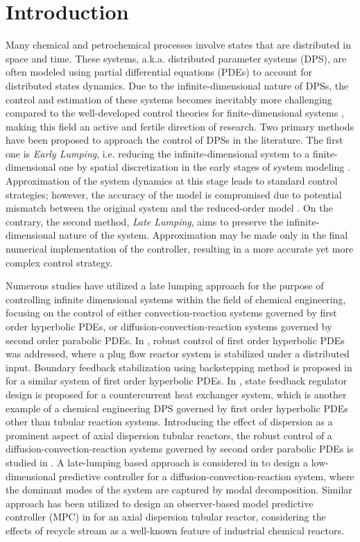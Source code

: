 \section{Introduction}

Many chemical and petrochemical processes involve states that are distributed in space and time. These systems, a.k.a. distributed parameter systems (DPS), are often modeled using partial differential equations (PDEs) to account for distributed states dynamics. Due to the infinite-dimensional nature of DPSs, the control and estimation of these systems becomes inevitably more challenging compared to the well-developed control theories for finite-dimensional systems \cite{ray1981advanced}, making this field an active and fertile direction of research. Two primary methods have been proposed to approach the control of DPSs in the literature. The first one is \textit{Early Lumping}, i.e. reducing the infinite-dimensional system to a finite-dimensional one by spatial discretization in the early stages of system modeling \cite{davison1976robust}. Approximation of the system dynamics at this stage leads to standard control strategies; however, the accuracy of the model is compromised due to potential mismatch between the original system and the reduced-order model \cite{moghadam2012infinite}. On the contrary, the second method, \textit{Late Lumping}, aims to preserve the infinite-dimensional nature of the system. Approximation may be made only in the final numerical implementation of the controller, resulting in a more accurate yet more complex control strategy.

Numerous studies have utilized a late lumping approach for the purpose of controlling infinite dimensional systems within the field of chemical engineering, focusing on the control of either convection-reaction systems governed by first order hyperbolic PDEs, or diffusion-convection-reaction systems governed by second order parabolic PDEs. 
In \cite{christofides1996feedback}, robust control of first order hyperbolic PDEs was addressed, where a plug flow reactor system is stabilized under a distributed input. 
Boundary feedback stabilization using backstepping method is proposed in \cite{krstic2008backstepping} for a similar system of first order hyperbolic PDEs. 
In \cite{xu2016state}, state feedback regulator design is proposed for a countercurrent heat exchanger system, which is another example of a chemical engineering DPS governed by first order hyperbolic PDEs other than tubular reaction systems.
Introducing the effect of dispersion as a prominent aspect of axial dispersion tubular reactors, the robust control of a diffusion-convection-reaction systems governed by second order parabolic PDEs is studied in \cite{christofides1998robust}. 
A late-lumping based approach is considered in \cite{dubljevic2006predictive2} to design a low-dimensional predictive controller for a diffusion-convection-reaction system, where the dominant modes of the system are captured by modal decomposition. 
Similar approach has been utilized to design an observer-based model predictive controller (MPC) in \cite{khatibi2021model} for an axial dispersion tubular reactor, considering the effects of recycle stream as a well-known feature of industrial chemical reactors.

